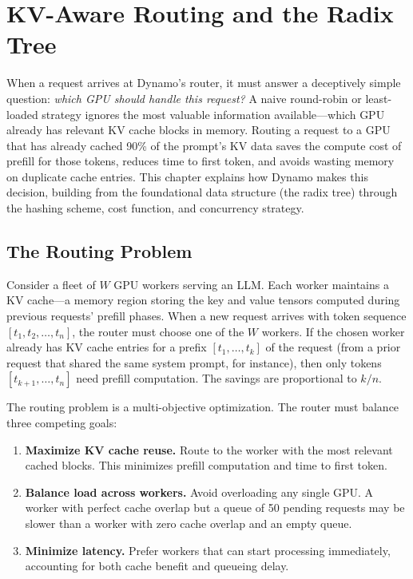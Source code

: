 \chapter{KV-Aware Routing and the Radix Tree}
\label{ch:kvrouter}

When a request arrives at Dynamo's router, it must answer a deceptively simple question: \emph{which GPU should handle this request?} A naive round-robin or least-loaded strategy ignores the most valuable information available---which GPU already has relevant KV cache blocks in memory. Routing a request to a GPU that has already cached 90\% of the prompt's KV data saves the compute cost of prefill for those tokens, reduces time to first token, and avoids wasting memory on duplicate cache entries. This chapter explains how Dynamo makes this decision, building from the foundational data structure (the radix tree) through the hashing scheme, cost function, and concurrency strategy.

\section{The Routing Problem}
\label{sec:kvrouter:problem}

%
Consider a fleet of $W$ GPU workers serving an LLM. Each worker maintains a KV cache---a memory region storing the key and value tensors computed during previous requests' prefill phases. When a new request arrives with token sequence $[t_1, t_2, \ldots, t_n]$, the router must choose one of the $W$ workers. If the chosen worker already has KV cache entries for a prefix $[t_1, \ldots, t_k]$ of the request (from a prior request that shared the same system prompt, for instance), then only tokens $[t_{k+1}, \ldots, t_n]$ need prefill computation. The savings are proportional to $k/n$.

The routing problem is a multi-objective optimization. The router must balance three competing goals:

\begin{enumerate}
  \item \textbf{Maximize KV cache reuse.} Route to the worker with the most relevant cached blocks. This minimizes prefill computation and time to first token.
  \item \textbf{Balance load across workers.} Avoid overloading any single GPU. A worker with perfect cache overlap but a queue of 50 pending requests may be slower than a worker with zero cache overlap and an empty queue.
  \item \textbf{Minimize latency.} Prefer workers that can start processing immediately, accounting for both cache benefit and queueing delay.
\end{enumerate}

